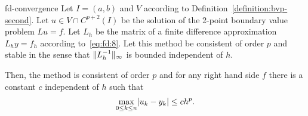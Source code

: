 \begin{Theorem}{fd-convergence}
  Let $I=(a,b)$ and $V$ according to
  Definition~\ref{definition:bvp-second}. Let $u\in V \cap C^{p+2}(I)$
  be the solution of the 2-point boundary value problem $Lu = f$. Let
  $L_h$ be the matrix of a finite difference approximation $L_h y=f_h$
  according to~\eqref{eq:fd:8}. Let this method be consistent of order
  $p$ and stable in the sense that $\lVert L_h^{-1}\rVert_\infty$ is bounded
  independent of $h$.
  
  Then, the method is consistent of order $p$ and for any right hand
  side $f$ there is a constant $c$ independent of $h$ such that
  \begin{gather}
    \label{eq:fd-convergence:1}
    \max_{0\le k\le n}\lvert u_k - y_k\rvert \le c h^p.
  \end{gather}
\end{Theorem}
